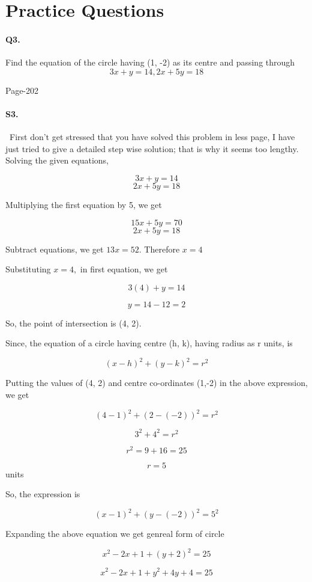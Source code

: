 \documentclass{article}
\begin{document}
\section*{Practice Questions}
\paragraph{Q3.}Find the equation of the circle having (1, -2) as its centre and passing through $$3x + y = 14, 2x + 5y = 18$$
\begin{flushright}
    Page-202
\end{flushright}

\paragraph{S3.}\
First don't get stressed that you have solved this problem in less page, I have just tried to give a detailed step wise solution; that is why it seems too lengthy.  Solving the given equations,

$$3x + y = 14$$
$$2x + 5y = 18$$

Multiplying the first equation by 5, we get

$$15x + 5y = 70$$
$$2x + 5y = 18$$

Subtract equations, we get $13 x = 52$. Therefore $x = 4$

Substituting $x = 4,$ in first equation, we get

$$3 (4) + y = 14$$

$$y = 14 - 12 = 2$$

So, the point of intersection is (4, 2).

Since, the equation of a circle having centre (h, k), having radius as r units, is

$$(x - h)^2 + (y - k)^2 = r^2$$

Putting the values of (4, 2) and centre co-ordinates (1,-2) in the above expression, we get

$$(4 - 1)^2 + (2 - (-2))^2 = r^2$$

$$3^2 + 4^2 = r^2$$

$$r^2 = 9 + 16 = 25$$

$$r = 5$$ units

So, the expression is

$$(x - 1)^2 + (y - (-2))^2 = 5^2$$

Expanding the above equation we get genreal form of circle

$$x^2 - 2x + 1 + (y + 2)^2 = 25$$

$$x^2 - 2x + 1 + y^2 + 4y + 4 = 25$$
\end{document}

